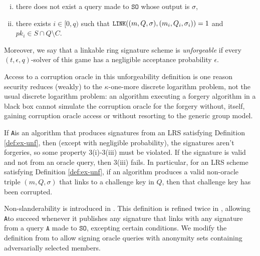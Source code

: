 \documentclass{llncs}
\newcommand{\A}{\texttt{A}}
\begin{document}
\begin{definition}
\begin{enumerate}
\begin{enumerate}[(i)]
    \item there does not exist a query made to $\texttt{SO}$ whose output is $\sigma$,

    \item there exists $i \in [0,q)$ such that ${\small \texttt{LINK}((m, Q, \sigma), (m_i, Q_i, \sigma_i)) = 1}$ and $pk_i \in S \cap Q \setminus C$.
    \end{enumerate}
\end{enumerate}
Moreover, we say that a linkable ring signature scheme is \textit{unforgeable} if every $(t, \epsilon, q)$-solver of this game has a negligible acceptance probability $\epsilon$.
\end{definition}

\begin{remark}
Access to a corruption oracle in this unforgeability definition is one reason security reduces (weakly) to the $\kappa$-one-more discrete logarithm problem, not the usual discrete logarithm problem: an algorithm executing a forgery algorithm in a black box cannot simulate the corruption oracle for the forgery without, itself, gaining corruption oracle access or without resorting to the generic group model.
\end{remark}

\begin{remark}
If \A is an algorithm that produces signatures from an LRS satisfying Definition \ref{def:ex-unf}, then (except with negligible probability), the signatures aren't forgeries, so some property 3(i)-3(iii) must be violated. If the signature is valid and not from an oracle query, then 3(iii) fails. In particular, for an LRS scheme satisfying Definition \ref{def:ex-unf}, if an algorithm produces a valid non-oracle triple $(m, Q, \sigma)$ that links to a challenge key in $Q$, then that challenge key has been corrupted.
\end{remark}

Non-slanderability is introduced in \cite{tsang2004separable}.  This definition is refined twice in \cite{au2006short}, allowing \A to succeed whenever it publishes any signature that links with any signature from a query $\A$ made to $\texttt{SO}$, excepting certain conditions. We modify the definition from \cite{au2006short} to allow signing oracle queries with anonymity sets containing adversarially selected members.
\end{document}
